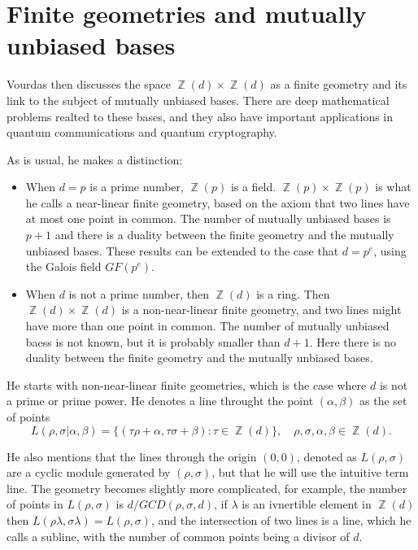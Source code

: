 \documentclass[a4paper]{article}
\DeclareMathOperator{\Z}{\mathbb{Z}}
\begin{document}
  \section{Finite geometries and mutually unbiased bases}

  Vourdas then discusses the space $\Z(d) \times \Z(d)$ as a
  finite geometry and its link to the subject of mutually
  unbiased bases. There are deep mathematical problems
  realted to these bases, and they also have important
  applications in quantum communications and quantum
  cryptography.

  As is usual, he makes a distinction:
  \begin{itemize}
    \item When $d = p$ is a prime number, $\Z(p)$ is a
      field. $\Z(p) \times \Z(p)$ is what he calls a
      near-linear finite geometry, based on the axiom that
      two lines have at most one point in common. The number
      of mutually unbiased bases is $p+1$ and there is a
      duality between the finite geometry and the mutually
      unbiased bases. These results can be extended to the
      case that $d = p^{e}$, using the Galois field
      $GF(p^{e})$.
    \item When $d$ is not a prime number, then $\Z(d)$ is a
      ring. Then $\Z(d) \times \Z(d)$ is a non-near-linear
      finite geometry, and two lines might have more than
      one point in common. The number of mutually unbiased
      baess is not known, but it is probably smaller than
      $d+1$. Here there is no duality between the finite
      geometry and the mutually unbiased bases.
  \end{itemize}

  He starts with non-near-linear finite geometries, which is
  the case where $d$ is not a prime or prime power. He
  denotes a line throught the point $(\alpha,\beta)$ as the
  set of points
  \[
    L(\rho,\sigma | \alpha,\beta)
    = \{(\tau \rho + \alpha, \tau \sigma + \beta) : \tau \in
    \Z(d)\},
    \quad
    \rho,\sigma,\alpha,\beta \in \Z(d).
  \] 

  He also mentions that the lines through the origin
  $(0,0)$, denoted as $L(\rho,\sigma)$ are a cyclic module
  generated by $(\rho,\sigma)$, but that he will use the
  intuitive term line. The geometry becomes slightly more
  complicated, for example, the number of points in
  $L(\rho,\sigma)$ is $d / GCD(\rho,\sigma,d)$, if $\lambda$ 
  is an ivnertible element in $\Z(d)$ then
  $L(\rho\lambda,\sigma\lambda) = L(\rho,\sigma)$, and the
  intersection of two lines is a line, which he calls a
  subline, with the number of common points being a divisor
  of $d$.
\end{document}
